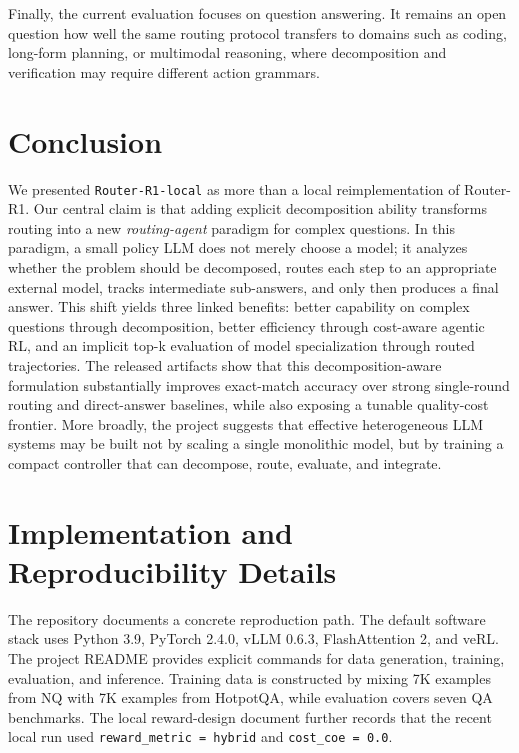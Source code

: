 \documentclass{article}
\begin{document}
Finally, the current evaluation focuses on question answering. It remains an open question how well the same routing protocol transfers to domains such as coding, long-form planning, or multimodal reasoning, where decomposition and verification may require different action grammars.

\section{Conclusion}
\label{sec:conclusion}

We presented \texttt{Router-R1-local} as more than a local reimplementation of Router-R1. Our central claim is that adding explicit decomposition ability transforms routing into a new \emph{routing-agent} paradigm for complex questions. In this paradigm, a small policy LLM does not merely choose a model; it analyzes whether the problem should be decomposed, routes each step to an appropriate external model, tracks intermediate sub-answers, and only then produces a final answer. This shift yields three linked benefits: better capability on complex questions through decomposition, better efficiency through cost-aware agentic RL, and an implicit top-k evaluation of model specialization through routed trajectories. The released artifacts show that this decomposition-aware formulation substantially improves exact-match accuracy over strong single-round routing and direct-answer baselines, while also exposing a tunable quality-cost frontier. More broadly, the project suggests that effective heterogeneous LLM systems may be built not by scaling a single monolithic model, but by training a compact controller that can decompose, route, evaluate, and integrate.




\appendix

\section{Implementation and Reproducibility Details}
\label{app:repro}

The repository documents a concrete reproduction path. The default software stack uses Python 3.9, PyTorch 2.4.0, vLLM 0.6.3, FlashAttention 2, and veRL. The project README provides explicit commands for data generation, training, evaluation, and inference. Training data is constructed by mixing 7K examples from NQ with 7K examples from HotpotQA, while evaluation covers seven QA benchmarks. The local reward-design document further records that the recent local run used \texttt{reward\_metric = hybrid} and \texttt{cost\_coe = 0.0}.
\end{document}
